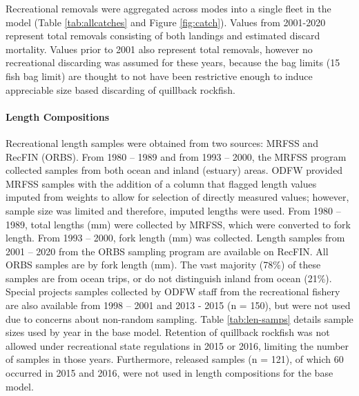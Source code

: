 \documentclass[11pt,
  english,
  a4paper,
]{article}
\begin{document}
\leavevmode\tagmcend\tagstructend\par


Recreational removals were aggregated across modes into a single fleet in the model (Table \ref{tab:allcatches} and Figure \ref{fig:catch}). Values from 2001-2020 represent total removals consisting of both landings and estimated discard mortality. Values prior to 2001 also represent total removals, however no recreational discarding was assumed for these years, because the bag limits (15 fish bag limit) are thought to not have been restrictive enough to induce appreciable size based discarding of quillback rockfish.

\leavevmode\tagmcend\tagstructend\par


\hypertarget{length-compositions-1}{%
\paragraph{Length Compositions}\label{length-compositions-1}}

\leavevmode\tagmcend\tagstructend


Recreational length samples were obtained from two sources: MRFSS and RecFIN (ORBS). From 1980 -- 1989 and from 1993 -- 2000, the MRFSS program collected samples from both ocean and inland (estuary) areas. ODFW provided MRFSS samples with the addition of a column that flagged length values imputed from weights to allow for selection of directly measured values; however, sample size was limited and therefore, imputed lengths were used. From 1980 -- 1989, total lengths (mm) were collected by MRFSS, which were converted to fork length. From 1993 -- 2000, fork length (mm) was collected. Length samples from 2001 -- 2020 from the ORBS sampling program are available on RecFIN. All ORBS samples are by fork length (mm). The vast majority (78\%) of these samples are from ocean trips, or do not distinguish inland from ocean (21\%). Special projects samples collected by ODFW staff from the recreational fishery are also available from 1998 -- 2001 and 2013 - 2015 (n = 150), but were not used due to concerns about non-random sampling. Table \ref{tab:len-samps} details sample sizes used by year in the base model. Retention of quillback rockfish was not allowed under recreational state regulations in 2015 or 2016, limiting the number of samples in those years. Furthermore, released samples (n = 121), of which 60 occurred in 2015 and 2016, were not used in length compositions for the base model.
\end{document}
